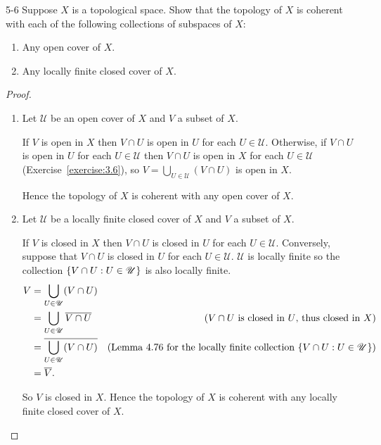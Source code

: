 \begin{problem}{5-6}\label{problem:5-6}
Suppose $X$ is a topological space. Show that the topology of $X$ is coherent with each of the following collections of subspaces of $X$:
\begin{enumerate}[label={(\alph*)}]
	\item Any open cover of $X$.
	\item Any locally finite closed cover of $X$.
\end{enumerate}
\end{problem}

\begin{proof}
	\begin{enumerate}[label={(\alph*)}]
		\item Let $\mathscr{U}$ be an open cover of $X$ and $V$ a subset of $X$.

		      If $V$ is open in $X$ then $V\cap U$ is open in $U$ for each $U\in\mathscr{U}$. Otherwise, if $V\cap U$ is open in $U$ for each $U\in\mathscr{U}$ then $V\cap U$ is open in $X$ for each $U\in\mathscr{U}$ (Exercise~\ref{exercise:3.6}), so $V = \bigcup_{U\in\mathscr{U}}(V\cap U)$ is open in $X$.

		      Hence the topology of $X$ is coherent with any open cover of $X$.
		\item Let $\mathscr{U}$ be a locally finite closed cover of $X$ and $V$ a subset of $X$.

		      If $V$ is closed in $X$ then $V\cap U$ is closed in $U$ for each $U\in\mathscr{U}$. Conversely, suppose that $V\cap U$ is closed in $U$ for each $U\in\mathscr{U}$. $\mathscr{U}$ is locally finite so the collection $\left\{{ V\cap U : U\in\mathscr{U} }\right\}$ is also locally finite.
		      \begin{align*}
			      V & = \bigcup_{U\in\mathscr{U}} (V\cap U)                                                                                                        \\
			        & = \bigcup_{U\in\mathscr{U}} \overline{V\cap U}   & \text{($V\cap U$ is closed in $U$, thus closed in $X$)}                                   \\
			        & = \overline{\bigcup_{U\in\mathscr{U}} (V\cap U)} & \text{(Lemma 4.76 for the locally finite collection $\left\{{ V\cap U : U\in\mathscr{U} }\right\}$)} \\
			        & = \overline{V}.
		      \end{align*}

		      So $V$ is closed in $X$. Hence the topology of $X$ is coherent with any locally finite closed cover of $X$.
	\end{enumerate}
\end{proof}

